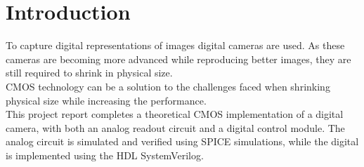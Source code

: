 \section{Introduction}
To capture digital representations of images digital cameras are used. 
As these cameras are becoming more advanced while reproducing better images, they are still required to shrink in physical size.\\
CMOS technology can be a solution to the challenges faced when shrinking physical size while increasing the performance. \\

This project report completes a theoretical CMOS implementation of a digital camera, with both an analog readout circuit and a digital control module.
The analog circuit is simulated and verified using SPICE simulations, while the digital is implemented using the HDL SystemVerilog. 
